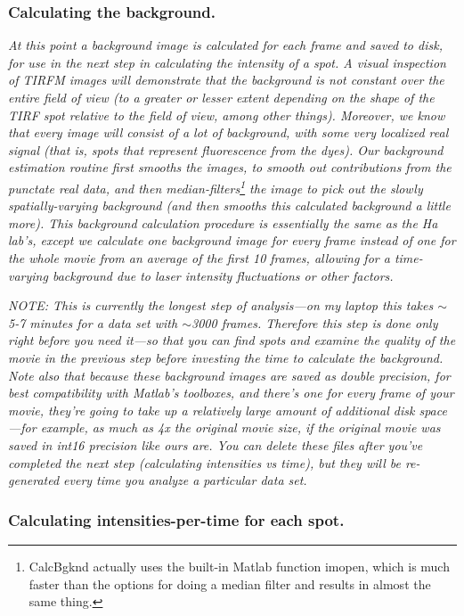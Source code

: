 \documentclass[11pt]{article}
\begin{document}
\subsubsection{Calculating the background.}\label{sec:BkgndSub}

{\it At this point a background image is calculated for each frame and saved to disk, for use in the next step in calculating the intensity of a spot.  A visual inspection of TIRFM images will demonstrate that the background is not constant over the entire field of view (to a greater or lesser extent depending on the shape of the TIRF spot relative to the field of view, among other things).  Moreover, we know that every image will consist of a lot of background, with some very localized real signal (that is, spots that represent fluorescence from the dyes).  Our background estimation routine first smooths the images, to smooth out contributions from the punctate real data, and then median-filters\footnote{CalcBgknd actually uses the built-in Matlab function imopen, which is much faster than the options for doing a median filter and results in almost the same thing.} the image to pick out the slowly spatially-varying background (and then smooths this calculated background a little more).  This background calculation procedure is essentially the same as the Ha lab's, except we calculate one background image for every frame instead of one for the whole movie from an average of the first 10 frames, allowing for a time-varying background due to laser intensity fluctuations or other factors.}

{\it NOTE: This is currently the longest step of analysis---on my laptop this takes $\sim$5-7 minutes for a data set with $\sim$3000 frames.  Therefore this step is done only right before you need it---so that you can find spots and examine the quality of the movie in the previous step before investing the time to calculate the background.  Note also that because these background images are saved as double precision, for best compatibility with Matlab's toolboxes, and there's one for every frame of your movie, they're going to take up a relatively large amount of additional disk space---for example, as much as 4x the original movie size, if the original movie was saved in int16 precision like ours are.  You can delete these files after you've completed the next step (calculating intensities vs time), but they will be re-generated every time you analyze a particular data set. }

\subsubsection{Calculating intensities-per-time for each spot.}
\end{document}
